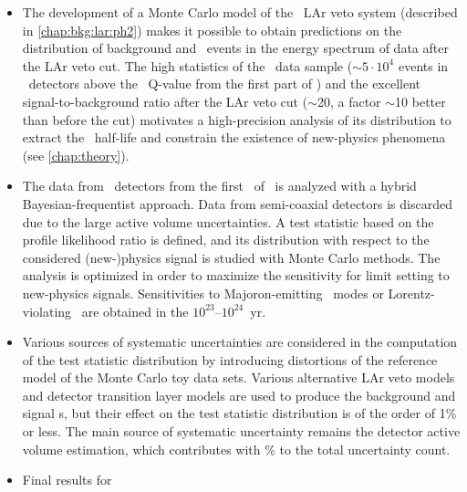 \chapsummary
\begin{itemize}
  \item The development of a Monte Carlo model of the \gerda\ LAr veto system (described
    in \cref{chap:bkg:lar:ph2}) makes it possible to obtain predictions on the
    distribution of background and \nnbb\ events in the energy spectrum of data after the
    LAr veto cut. The high statistics of the \nnbb\ data sample ($\sim$$5 \cdot 10^4$
    events in \bege\ detectors above the \Arl\ Q-value from the first part of \phasetwo)
    and the excellent signal-to-background ratio after the LAr veto cut ($\sim$20, a
    factor $\sim$10 better than before the cut) motivates a high-precision analysis of its
    distribution to extract the \nnbb\ half-life and constrain the existence of
    new-physics phenomena (see \cref{chap:theory}).
  \item The data from \bege\ detectors from the first \gexpophasetwobkg\ of \phasetwo\
    is analyzed with a hybrid Bayesian-frequentist approach. Data from semi-coaxial
    detectors is discarded due to the large active volume uncertainties. A test statistic
    based on the profile likelihood ratio is defined, and its distribution with respect to
    the considered (new-)physics signal is studied with Monte Carlo methods. The analysis
    is optimized in order to maximize the sensitivity for limit setting to new-physics
    signals. Sensitivities to Majoron-emitting \onbb\ modes or Lorentz-violating \nnbb\
    are obtained in the $10^{23}$--$10^{24}$~yr.
  \item Various sources of systematic uncertainties are considered in the computation of
    the test statistic distribution by introducing distortions of the reference model of
    the Monte Carlo toy data sets. Various alternative LAr veto models and detector
    transition layer models are used to produce the background and signal \pdf{}s, but their
    effect on the test statistic distribution is of the order of 1\% or less. The main
    source of systematic uncertainty remains the detector active volume estimation, which
    contributes with \fillme{?}\% to the total uncertainty count.
  \item Final results for \thalftwo\ \fillme{\ldots}
\end{itemize}

